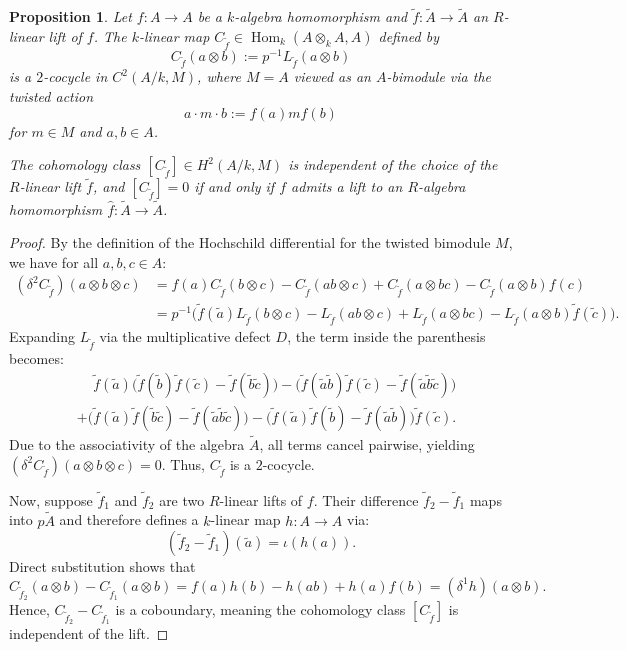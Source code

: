 \documentclass[a4paper,11pt,reqno]{amsart}%
\newtheorem{proposition}[theorem]{Proposition}
\theoremstyle{definition}
\newcommand{\Hom}{\operatorname{Hom}}
\newcommand{\<}{\<}
\renewcommand{\>}{\>}
\newcommand{\lA}{\widetilde{A}}
\newcommand{\lf}{\widetilde{f}}
\numberwithin{equation}{subsection}
\begin{document}
\begin{proposition}\label{proposition:cocycle}
Let $f: A \to A$ be a $k$-algebra homomorphism and $\lf: \lA \to \lA$ an $R$-linear lift of $f$. The $k$-linear map $C_{\lf} \in \Hom_k(A \otimes_k A, A)$ defined by 
$$
C_{\lf}(a \otimes b) := p^{-1} L_{\lf}(a \otimes b) 
$$ 
is a $2$-cocycle in $C^2(A/k, M)$, where $M = A$ viewed as an $A$-bimodule via the twisted action
$$
a \cdot m \cdot b := f(a) m f(b)
$$
for $m \in M$ and $a, b \in A$. 

The cohomology class $[C_{\lf}] \in H^2(A/k, M)$ is independent of the choice of the $R$-linear lift $\lf$, and $[C_{\lf}] = 0$ if and only if $f$ admits a lift to an $R$-algebra homomorphism $\widehat{f}: \lA \to \lA$.
\end{proposition}

\begin{proof}
By the definition of the Hochschild differential for the twisted bimodule $M$, we have for all $a,b,c \in A$:
\begin{align*} 
(\delta^2 C_{\lf})(a \otimes b \otimes c) &= f(a) C_{\lf}(b \otimes c) - C_{\lf}(ab \otimes c) + C_{\lf}(a \otimes bc) - C_{\lf}(a \otimes b) f(c) \\
&= p^{-1} \Big( \lf(\tilde{a}) L_{\lf}(b \otimes c) - L_{\lf}(ab \otimes c) + L_{\lf}(a \otimes bc) - L_{\lf}(a \otimes b) \lf(\tilde{c}) \Big).
\end{align*}
Expanding $L_{\lf}$ via the multiplicative defect $D$, the term inside the parenthesis becomes:
\begin{align*}
&\quad\, \lf(\tilde{a}) \big( \lf(\tilde{b})\lf(\tilde{c}) - \lf(\tilde{b}\tilde{c}) \big) - \big( \lf(\tilde{a}\tilde{b})\lf(\tilde{c}) - \lf(\tilde{a}\tilde{b}\tilde{c}) \big) \\
&+ \big( \lf(\tilde{a})\lf(\tilde{b}\tilde{c}) - \lf(\tilde{a}\tilde{b}\tilde{c}) \big) - \big( \lf(\tilde{a})\lf(\tilde{b}) - \lf(\tilde{a}\tilde{b}) \big) \lf(\tilde{c}).
\end{align*}
Due to the associativity of the algebra $\lA$, all terms cancel pairwise, yielding $(\delta^2 C_{\lf})(a \otimes b \otimes c) = 0$. Thus, $C_{\lf}$ is a $2$-cocycle.

Now, suppose $\lf_1$ and $\lf_2$ are two $R$-linear lifts of $f$. Their difference $\lf_2 - \lf_1$ maps into $p\lA$ and therefore defines a $k$-linear map $h: A \to A$ via:
$$
(\lf_2 - \lf_1)(\tilde{a}) = \iota(h(a)).
$$
Direct substitution shows that
$$
C_{\lf_2}(a \otimes b) - C_{\lf_1}(a \otimes b) = f(a)h(b) - h(ab) + h(a)f(b) = (\delta^1 h)(a \otimes b).
$$
Hence, $C_{\lf_2} - C_{\lf_1}$ is a coboundary, meaning the cohomology class $[C_{\lf}]$ is independent of the lift.


\end{proof}
\end{document}

